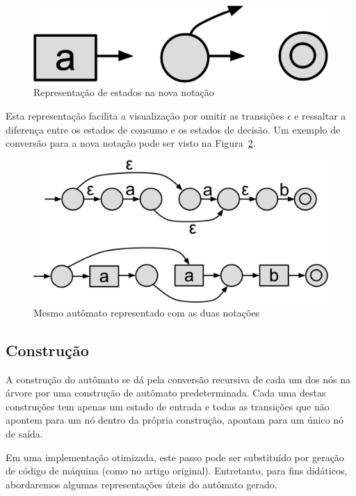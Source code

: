 \documentclass[a4paper,12pt,oneside,onecolumn]{uerj}
\begin{document}
\begin{figure}[!htbp]
  \centering
  \includegraphics[scale=0.5]{figures/nova_notacao.png}
  \caption{Representação de estados na nova notação}
  \label{fig:nova_notacao}
\end{figure}

Esta representação facilita a visualização por omitir as transições $\epsilon$ e ressaltar a diferença entre os estados de consumo e os estados de decisão. Um exemplo de conversão para a nova notação pode ser visto na Figura~\ref{fig:exemplo_nova_notacao}.

\begin{figure}[!htbp]
  \centering
  \includegraphics[scale=0.25]{figures/exemplo_nova_notacao.png}
  \caption{Mesmo autômato representado com as duas notações}
  \label{fig:exemplo_nova_notacao}
\end{figure}

\subsection{Construção}

A construção do autômato se dá pela conversão recursiva de cada um dos nós na árvore por uma construção de autômato predeterminada. Cada uma destas construções tem apenas um estado de entrada e todas as transições que não apontem para um nó dentro da própria construção, apontam para um único nó de saída.

Em uma implementação otimizada, este passo pode ser substituído por geração de código de máquina (como no artigo original). Entretanto, para fins didáticos, abordaremos algumas representações úteis do autômato gerado.
\end{document}
